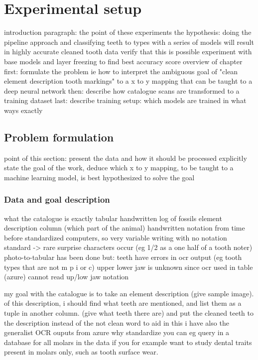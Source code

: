 \documentclass{article}
\begin{document}
\section{Experimental setup}

introduction paragraph: the point of these experiments
the hypothesis: doing the pipeline approach and classifying teeth to types with a series of models
will result in highly accurate cleaned tooth data
    verify that this is possible
    experiment with base models and layer freezing to find best accuracy score
overview of chapter
    first: formulate the problem ie how to interpret the ambiguous goal of "clean element description tooth markings"
    to a x to y mapping that can be taught to a deep neural network
    then: describe how catalogue scans are transformed to a training dataset
    last: describe training setup: which models are trained in what ways exactly

\subsection{Problem formulation}

point of this section:
present the data and how it should be processed
explicitly state the goal of the work, deduce which x to y mapping, to be 
taught to a machine learning model, is best hypothesized to solve the goal

\subsubsection{Data and goal description}

what the catalogue is exactly
tabular handwritten log of fossils
element description column (which part of the animal)
    handwritten notation from time before standardized computers, so very variable writing with no notation standard
        -> rare surprise characters occur (eg 1/2 as a one half of a tooth noter)
photo-to-tabular has been done but:
    teeth have errors in ocr output (eg tooth types that are not m p i or c)
    upper lower jaw is unknown since ocr used in table (azure) cannot read up/low jaw notation

my goal
with the catalogue is to take an element description (give sample image).
of this description, i should find what teeth are mentioned, and list them as a tuple 
in another column. (give what teeth there are) and put the cleaned teeth to 
the description instead of the not clean word
to aid in this i have also the generalist OCR ouputs from azure
why standardize
    you can eg query in a database for all molars in the data 
    if you for example want to study dental traits present in molars only, such as tooth surface wear.
\end{document}
